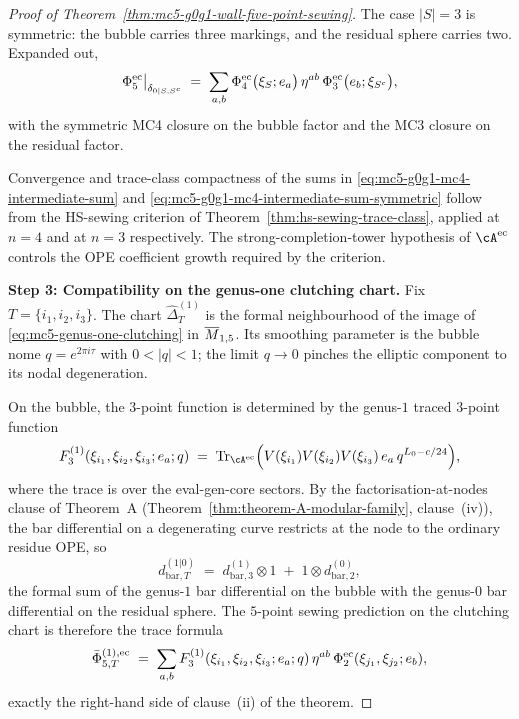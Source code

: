 \begin{proof}[Proof of Theorem~\ref{thm:mc5-g0g1-wall-five-point-sewing}]
The case $|S| = 3$ is symmetric: the bubble carries three markings, and
the residual sphere carries two. Expanded out,
\begin{equation}
\label{eq:mc5-g0g1-mc4-intermediate-sum-symmetric}
\Phi^{\mathrm{ec}}_{5}\big|_{\delta_{0|S, S^c}}
\;=\;
\sum_{a, b}
\Phi^{\mathrm{ec}}_{4}\bigl(\xi_{S}; e_{a}\bigr)
\,\eta^{ab}\,
\Phi^{\mathrm{ec}}_{3}\bigl(e_{b}; \xi_{S^c}\bigr),
\end{equation}
with the symmetric MC4 closure on the bubble factor and the MC3 closure
on the residual factor.

Convergence and trace-class compactness of the sums in
\eqref{eq:mc5-g0g1-mc4-intermediate-sum} and
\eqref{eq:mc5-g0g1-mc4-intermediate-sum-symmetric} follow from the
HS-sewing criterion of Theorem~\ref{thm:hs-sewing-trace-class}, applied
at $n = 4$ and at $n = 3$ respectively. The strong-completion-tower
hypothesis of $\cA^{\evcore}$ controls the OPE coefficient growth
required by the criterion.

\medskip
\textbf{Step 3: Compatibility on the genus-one clutching chart.}
Fix $T=\{i_1,i_2,i_3\}$. The chart
$\widehat{\Delta}^{(1)}_{T}$ is the formal neighbourhood of the image of
\eqref{eq:mc5-genus-one-clutching} in $\overline{M}_{1,5}$. Its smoothing
parameter is the bubble nome $q=e^{2\pi i\tau}$ with $0<|q|<1$; the
limit $q\to0$ pinches the elliptic component to its nodal
degeneration.

On the bubble, the $3$-point function is determined by the genus-$1$
traced $3$-point function
\begin{equation}
\label{eq:mc5-g0g1-genus-1-traced-three-point}
F^{(1)}_{3}(\xi_{i_{1}}, \xi_{i_{2}}, \xi_{i_{3}}; e_{a}; q)
\;=\;
\mathrm{Tr}_{\cA^{\evcore}}\Bigl(V(\xi_{i_{1}}) V(\xi_{i_{2}}) V(\xi_{i_{3}})
\, e_{a} \, q^{L_{0} - c/24}\Bigr),
\end{equation}
where the trace is over the eval-gen-core sectors. By the
factorisation-at-nodes clause of Theorem~A
\textup{(}Theorem~\ref{thm:theorem-A-modular-family}, clause~(iv)\textup{)},
the bar differential on a degenerating curve restricts at the node to
the ordinary residue OPE, so
\begin{equation}
\label{eq:mc5-g0g1-bar-differential-restriction-corner}
d_{\mathrm{bar},T}^{(1|0)}
\;=\;
d^{(1)}_{\mathrm{bar}, 3} \otimes 1 \;+\; 1 \otimes d^{(0)}_{\mathrm{bar}, 2},
\end{equation}
the formal sum of the genus-$1$ bar differential on the bubble with the
genus-$0$ bar differential on the residual sphere. The $5$-point sewing
prediction on the clutching chart is therefore the trace formula
\begin{equation}
\label{eq:mc5-g0g1-corner-trace-formula}
\bar\Phi^{(1),\mathrm{ec}}_{5,T}
\;=\;
\sum_{a, b}
F^{(1)}_{3}(\xi_{i_{1}}, \xi_{i_{2}}, \xi_{i_{3}}; e_{a}; q)
\,\eta^{ab}\,
\Phi^{\mathrm{ec}}_{2}(\xi_{j_{1}}, \xi_{j_{2}}; e_{b}),
\end{equation}
exactly the right-hand side of clause~(ii) of the theorem.


\end{proof}
